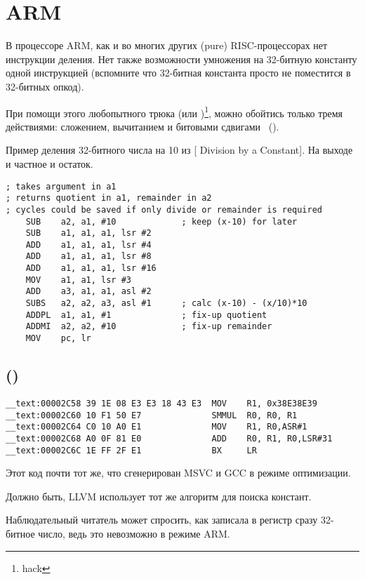 ﻿\section{ARM}

В процессоре ARM, как и во многих других  (pure) RISC-процессорах нет инструкции деления.
Нет также возможности умножения на 32-битную константу одной инструкцией (вспомните что 32-битная
константа просто не поместится в 32-битных опкод).

При помощи этого любопытного трюка (или )\footnote{hack}, можно обойтись только тремя действиями: 
сложением, вычитанием и битовыми сдвигами
~().

Пример деления 32-битного числа на 10 из
[ Division by a Constant].
На выходе и частное и остаток.

\begin{lstlisting}
; takes argument in a1
; returns quotient in a1, remainder in a2
; cycles could be saved if only divide or remainder is required
    SUB    a2, a1, #10             ; keep (x-10) for later
    SUB    a1, a1, a1, lsr #2
    ADD    a1, a1, a1, lsr #4
    ADD    a1, a1, a1, lsr #8
    ADD    a1, a1, a1, lsr #16
    MOV    a1, a1, lsr #3
    ADD    a3, a1, a1, asl #2
    SUBS   a2, a2, a3, asl #1      ; calc (x-10) - (x/10)*10
    ADDPL  a1, a1, #1              ; fix-up quotient
    ADDMI  a2, a2, #10             ; fix-up remainder
    MOV    pc, lr
\end{lstlisting}

\subsection{\OptimizingXcodeIV (\ARMMode)}

\begin{lstlisting}
__text:00002C58 39 1E 08 E3 E3 18 43 E3  MOV    R1, 0x38E38E39
__text:00002C60 10 F1 50 E7              SMMUL  R0, R0, R1
__text:00002C64 C0 10 A0 E1              MOV    R1, R0,ASR#1
__text:00002C68 A0 0F 81 E0              ADD    R0, R1, R0,LSR#31
__text:00002C6C 1E FF 2F E1              BX     LR
\end{lstlisting}

Этот код почти тот же, что сгенерирован MSVC и GCC в режиме оптимизации.

Должно быть, LLVM использует тот же алгоритм для поиска констант.

Наблюдательный читатель может спросить, как \MOV записала в регистр сразу 32-битное число, 
ведь это невозможно в режиме ARM.

